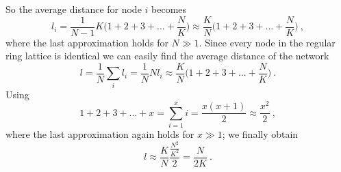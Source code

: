 \documentclass[11 pt , letterpaper , twoside , openright]{book}
\begin{document}
So the average distance for node $i$ becomes \cite{chap9}
\begin{equation}
	l_i = \frac{1}{N-1} K \bigg(1 + 2 + 3 + ... + \frac{N}{K} \bigg) \approx \frac{K}{N} \bigg(1 + 2 + 3 + ... + \frac{N}{K} \bigg) \ ,
\end{equation}
where the last approximation holds for $N \gg 1$. Since every node in the regular ring lattice is identical we can easily find the average distance of the network \cite{chap9}
\begin{equation}
	l = \frac{1}{N} \sum_i l_i = \frac{1}{N} N l_i \approx \frac{K}{N} \bigg(1 + 2 + 3 + ... + \frac{N}{K} \bigg) \ .
\end{equation}
Using \cite{chap9}
\begin{equation}
	1 + 2+ 3 +...+ x = \sum_{i = 1}^x i = \frac{x(x+1)}{2} \approx \frac{x^2}{2} \ ,
\end{equation}
where the last approximation again holds for $x \gg 1$; we finally obtain \cite{chap9}
\begin{equation}
	l \approx \frac{K}{N} \frac{\frac{N^2}{K^2}}{2} = \frac{N}{2K} \ .
\end{equation}

\newpage
\backmatter

\pagestyle{plain}

\end{document}
